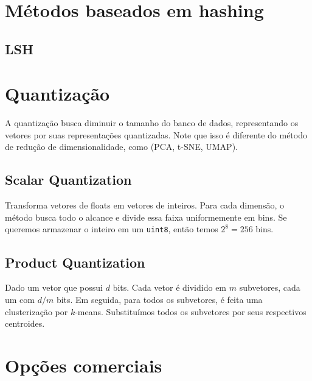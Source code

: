\section{Métodos baseados em hashing}

\subsection{LSH}

\section{Quantização}

A quantização busca diminuir o tamanho do banco de dados, representando os vetores por suas representações quantizadas. Note que isso é diferente do método de redução de dimensionalidade, como (PCA, t-SNE, UMAP).

\subsection{Scalar Quantization}

Transforma vetores de floats em vetores de inteiros. Para cada dimensão, o método busca todo o alcance e divide essa faixa uniformemente em bins. Se queremos armazenar o inteiro em um \texttt{uint8}, então temos $2^8 = 256$ bins.

\subsection{Product Quantization}

Dado um vetor que possui $d$ bits. Cada vetor é dividido em $m$ subvetores, cada um com $d/m$ bits. Em seguida, para todos os subvetores, é feita uma clusterização por $k$-means. Substituímos todos os subvetores por seus respectivos centroides.


\section{Opções comerciais}





\printbibliography
